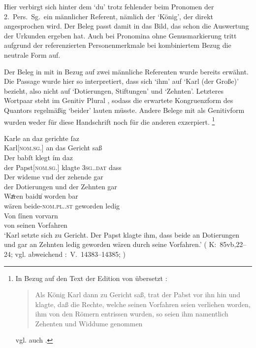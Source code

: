 Hier verbirgt sich hinter dem  `du' trotz fehlender
 beim Pronomen der 2.\ Pers.\ Sg.\ ein männlicher
Referent, nämlich der  `König', der direkt angesprochen wird. Der
Beleg passt damit in das Bild, das schon die Auswertung der Urkunden ergeben
hat. Auch bei Pro\-nomina ohne Genusmarkierung tritt aufgrund der
referenzierten Personenmerkmale bei kombiniertem Bezug die neutrale Form auf.

\label{phsec:babstimbaideu}
Der Beleg in  mit  in Bezug auf zwei
männliche Referenten wurde bereits erwähnt. Die Passage wurde hier so
interpretiert, dass sich  `ihm' auf  `Karl (der
Große)' bezieht, also nicht auf  `Dotierungen, Stiftungen'
\autocite[vgl. zur  Definition][s.\,v.~]{lexer:mhdhwb} und
 `Zehnten'. Letzteres Wortpaar steht im Genitiv Plural
\autocite[vgl.][341]{paul2007}, sodass die erwartete Kongruenzform des
Quantors regelmäßig  `beider' lauten müsste. Andere Belege
mit  als Genitivform wurden weder für diese Handschrift noch für
die anderen exzerpiert.%
%
	\footnote{In Bezug auf den Text der Edition von
	\citet{schroeder1895} übersetzt \citet[249]{mayer1874}:
	\blockquote{Als König Karl dann zu Gericht saß, trat der Pabst vor ihn hin
	und klagte, daß die Rechte, welche seinen Vorfahren seien verliehen worden,
	ihm von den Römern entrissen wurden, so seien ihm namentlich Zehenten und
	Widdume genommen}; vgl. auch \citet[83]{weis2022}.}

\begin{exe}
\ex\label{ex:babstimbaideu}
	\gll Karle an daz gerichte ſaz \\
		Karl[\textsc{nom.sg.\MascM}] an das Gericht saß \\
\sn \gll Der babſt klegt ím daz \\
		der Papst[\textsc{nom.sg.\MascM}] klagte \textsc{3sg.\MascM.dat} dass \\
\sn \gll Der wideme vnd der zehende gar \\
		der Dotierungen und der Zehnten gar \\
\sn \gll Waͤren baidu̍ worden bar \\
		wären beide-\textsc{nom.pl.\NeutM.st} geworden ledig \\
\sn \gll Von ſínen vorvarn \\
		von seinen Vorfahren \\
	\trans `Karl setzte sich zu Gericht. Der Papst klagte ihm, dass
		 beide an Dotierungen und gar an Zehnten ledig geworden
		wären durch seine Vorfahren.'
		(%
			K:~85vb,22--24; vgl. abweichend
			\KC:~V.~14383--14385;
			\cite[341]{schroeder1895}%
		)
\end{exe}

